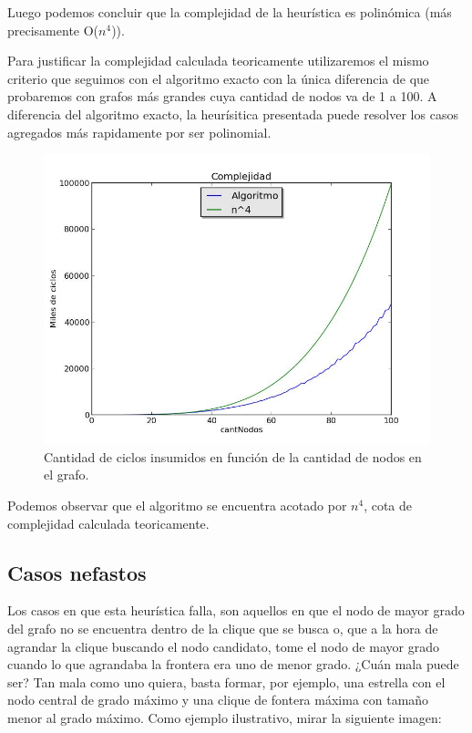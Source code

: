 Luego podemos concluir que la complejidad de la heurística es polinómica (más precisamente O($n^{4}$)). 

Para justificar la complejidad calculada teoricamente utilizaremos el mismo criterio que seguimos con el algoritmo exacto con la única diferencia de que probaremos con grafos más grandes cuya cantidad de nodos va de 1 a 100. A diferencia del algoritmo exacto, la heurísitica presentada puede resolver los casos agregados más rapidamente por ser polinomial.

\begin{figure}[H]
\centering\includegraphics[width=11 cm]{goloso/grafico.jpg}
\caption{Cantidad de ciclos insumidos en función de la cantidad de nodos en el grafo.}
\end{figure}

Podemos observar que el algoritmo se encuentra acotado por $n^4$, cota de complejidad calculada teoricamente.


\subsection{Casos nefastos}

Los casos en que esta heurística falla, son aquellos en que el nodo de mayor grado del grafo no se encuentra dentro de la clique que se busca o, que a la hora de agrandar la clique buscando el nodo candidato, tome el nodo de mayor grado cuando lo que agrandaba la frontera era uno de menor grado. 
¿Cuán mala puede ser? Tan mala como uno quiera, basta formar, por ejemplo, una estrella con el nodo central de grado máximo y una clique de fontera máxima con tamaño menor al grado máximo. Como ejemplo ilustrativo, mirar la siguiente imagen:

